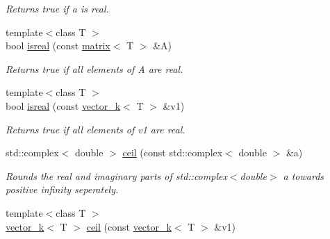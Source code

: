 \begin{DoxyCompactItemize}
\begin{DoxyCompactList}\small\item\em Returns true if a is real. \end{DoxyCompactList}\item 
\hypertarget{namespacekeycpp_a62d7118882bac24ab403ffb5f8ee7034}{{\footnotesize template$<$class T $>$ }\\bool \hyperlink{namespacekeycpp_a62d7118882bac24ab403ffb5f8ee7034}{isreal} (const \hyperlink{classkeycpp_1_1matrix}{matrix}$<$ T $>$ \&A)}\label{namespacekeycpp_a62d7118882bac24ab403ffb5f8ee7034}

\begin{DoxyCompactList}\small\item\em Returns true if all elements of A are real. \end{DoxyCompactList}\item 
\hypertarget{namespacekeycpp_ae5db41667f15caabbbdf37362e2f1990}{{\footnotesize template$<$class T $>$ }\\bool \hyperlink{namespacekeycpp_ae5db41667f15caabbbdf37362e2f1990}{isreal} (const \hyperlink{classkeycpp_1_1vector__k}{vector\-\_\-k}$<$ T $>$ \&v1)}\label{namespacekeycpp_ae5db41667f15caabbbdf37362e2f1990}

\begin{DoxyCompactList}\small\item\em Returns true if all elements of v1 are real. \end{DoxyCompactList}\item 
\hypertarget{namespacekeycpp_a005c1190f7087fb1d2545c38c080fd1a}{std\-::complex$<$ double $>$ \hyperlink{namespacekeycpp_a005c1190f7087fb1d2545c38c080fd1a}{ceil} (const std\-::complex$<$ double $>$ \&a)}\label{namespacekeycpp_a005c1190f7087fb1d2545c38c080fd1a}

\begin{DoxyCompactList}\small\item\em Rounds the real and imaginary parts of std\-::complex$<$double$>$ a towards positive infinity seperately. \end{DoxyCompactList}\item 
\hypertarget{namespacekeycpp_abc86c63af2d6788c45ac99a1f3b14ad8}{{\footnotesize template$<$class T $>$ }\\\hyperlink{classkeycpp_1_1vector__k}{vector\-\_\-k}$<$ T $>$ \hyperlink{namespacekeycpp_abc86c63af2d6788c45ac99a1f3b14ad8}{ceil} (const \hyperlink{classkeycpp_1_1vector__k}{vector\-\_\-k}$<$ T $>$ \&v1)}\label{namespacekeycpp_abc86c63af2d6788c45ac99a1f3b14ad8}


\end{DoxyCompactItemize}
